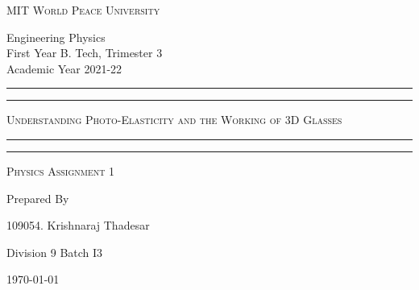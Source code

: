 \documentclass[11pt]{article}
\begin{document}
	
	\begin{titlepage} 
		\centering 
		
		
		\huge\textsc{
			MIT World Peace University
		}\\
	
		\vspace{0.75\baselineskip} %
		
		\LARGE{
			Engineering Physics\\
			First Year B. Tech, Trimester 3\\
			Academic Year 2021-22
		}
		
		\vfill %
		
		
		\rule{\textwidth}{1.6pt}\vspace*{-\baselineskip}\vspace*{2pt}
		\rule{\textwidth}{0.6pt}
		\vspace{0.75\baselineskip} %
		
		
		
		\huge{\textsc{
				Understanding Photo-Elasticity and the Working of 3D Glasses
			}} \\
		
		
		
		\vspace{0.5\baselineskip} %
		\rule{\textwidth}{0.6pt}\vspace*{-\baselineskip}\vspace*{2.8pt}
		\rule{\textwidth}{1.6pt}
		
		\vspace{1\baselineskip} %

			
		\LARGE\textsc{
			Physics Assignment 1
		} %
		\vfill
		
		
		Prepared By
		\vspace{0.5\baselineskip} %
		
		\Large{
			109054. Krishnaraj Thadesar
						
			Division 9 Batch I3
		}
		
		
		\vspace{0.5\baselineskip} %
		\today

	\end{titlepage}
	
\end{document}
